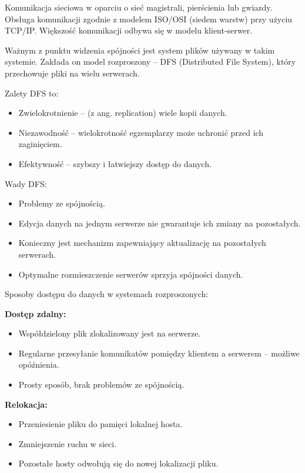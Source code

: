 Komunikacja sieciowa w oparciu o sieć magistrali, pierścienia lub gwiazdy. Obsługa komunikacji
zgodnie z modelem ISO/OSI (siedem warstw) przy użyciu TCP/IP. Większość komunikacji odbywa
się w modelu klient-serwer. 

Ważnym z punktu widzenia spójności jest system plików używany w takim systemie. Zakłada on model rozproszony -- DFS (Distributed File System), który przechowuje pliki na wielu serwerach.

Zalety DFS to:
\begin{itemize}
    \item Zwielokrotnienie -- (z ang. replication) wiele kopii danych.
    \item Niezawodność -- wielokrotność egzemplarzy może uchronić przed ich zaginięciem.
    \item Efektywność -- szybszy i łatwiejszy dostęp do danych.
\end{itemize}

Wady DFS:
\begin{itemize}
    \item Problemy ze spójnością.
    \item Edycja danych na jednym serwerze nie gwarantuje ich zmiany na pozostałych.
    \item Konieczny jest mechanizm zapewniający aktualizację na pozostałych serwerach.
    \item Optymalne rozmieszczenie serwerów sprzyja spójności danych.
\end{itemize}

Sposoby dostępu do danych w systemach rozproszonych:

\textbf{Dostęp zdalny:}
\begin{itemize}
    \item Współdzielony plik zlokalizowany jest na serwerze.
    \item Regularne przesyłanie komunikatów pomiędzy klientem a serwerem -- możliwe opóźnienia.
    \item Prosty sposób, brak problemów ze spójnością.
\end{itemize}

\textbf{Relokacja:}
\begin{itemize}
    \item Przeniesienie pliku do pamięci lokalnej hosta.
    \item Zmniejszenie ruchu w sieci.
    \item Pozostałe hosty odwołują się do nowej lokalizacji pliku.
\end{itemize}

